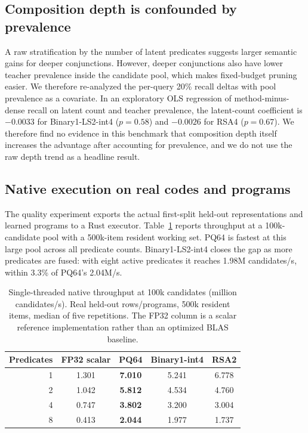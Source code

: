 \subsection{Composition depth is confounded by prevalence}
A raw stratification by the number of latent predicates suggests larger semantic gains for deeper conjunctions. However, deeper conjunctions also have lower teacher prevalence inside the candidate pool, which makes fixed-budget pruning easier. We therefore re-analyzed the per-query 20\% recall deltas with pool prevalence as a covariate. In an exploratory OLS regression of method-minus-dense recall on latent count and teacher prevalence, the latent-count coefficient is $-0.0033$ for Binary1-LS2-int4 ($p=0.58$) and $-0.0026$ for RSA4 ($p=0.67$). We therefore find no evidence in this benchmark that composition depth itself increases the advantage after accounting for prevalence, and we do not use the raw depth trend as a headline result.

\subsection{Native execution on real codes and programs}
The quality experiment exports the actual first-split held-out representations and learned programs to a Rust executor. Table~\ref{tab:native} reports throughput at a 100k-candidate pool with a 500k-item resident working set. PQ64 is fastest at this large pool across all predicate counts. Binary1-LS2-int4 closes the gap as more predicates are fused: with eight active predicates it reaches 1.98M candidates/s, within 3.3\% of PQ64's 2.04M/s.

\begin{table}[t]
\centering
\caption{Single-threaded native throughput at 100k candidates (million candidates/s). Real held-out rows/programs, 500k resident items, median of five repetitions. The FP32 column is a scalar reference implementation rather than an optimized BLAS baseline.}
\label{tab:native}
\small
\begin{tabular}{rcccc}
\toprule
Predicates & FP32 scalar & PQ64 & Binary1-int4 & RSA2\\
\midrule
1 & 1.301 & \textbf{7.010} & 5.241 & 6.778\\
2 & 1.042 & \textbf{5.812} & 4.534 & 4.760\\
4 & 0.747 & \textbf{3.802} & 3.200 & 3.004\\
8 & 0.413 & \textbf{2.044} & 1.977 & 1.737\\
\bottomrule
\end{tabular}
\end{table}

